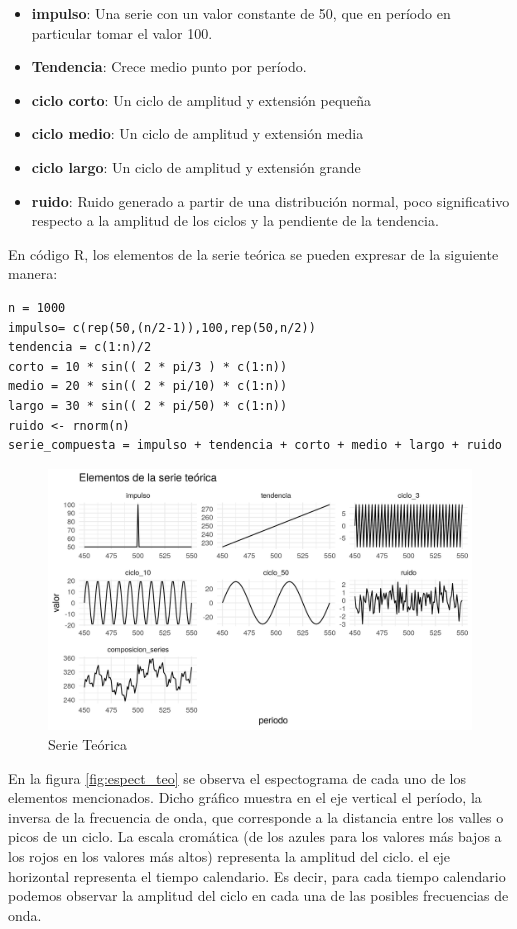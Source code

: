 \documentclass[a4paper]{article}
\begin{document}
\begin{itemize}
	\item \textbf{impulso}: Una serie con un valor constante de 50, que en período en particular tomar el valor 100.
	\item \textbf{Tendencia}: Crece medio punto por período.
	\item \textbf{ciclo corto}: Un ciclo de amplitud y extensión pequeña
	\item \textbf{ciclo medio}: Un ciclo de amplitud y extensión media
	\item \textbf{ciclo largo}: Un ciclo de amplitud y extensión grande
	\item \textbf{ruido}: Ruido generado a partir de una distribución normal, poco significativo respecto a la amplitud de los ciclos y la pendiente de la tendencia.
\end{itemize}

En código R, los elementos de la serie teórica se pueden expresar de la siguiente manera:

\begin{lstlisting}
n = 1000
impulso= c(rep(50,(n/2-1)),100,rep(50,n/2))
tendencia = c(1:n)/2
corto = 10 * sin(( 2 * pi/3 ) * c(1:n))
medio = 20 * sin(( 2 * pi/10) * c(1:n))
largo = 30 * sin(( 2 * pi/50) * c(1:n))
ruido <- rnorm(n)
serie_compuesta = impulso + tendencia + corto + medio + largo + ruido
\end{lstlisting}


\begin{figure}[H]
	\centering
	\includegraphics[width=\linewidth]{serie_teorica.PNG}
	\caption{Serie Teórica} \label{fig:serie_teorica}
\end{figure}

En la figura \ref{fig:espect_teo} se observa el espectograma de cada uno de los elementos mencionados. Dicho gráfico muestra en el eje vertical el período, la inversa de la frecuencia de onda, que corresponde a la distancia entre los valles o picos de un ciclo. La escala cromática (de los azules para los valores más bajos a los rojos en los valores más altos) representa la amplitud del ciclo. el eje horizontal representa el tiempo calendario. Es decir, para cada tiempo calendario podemos observar la amplitud del ciclo en cada una de las posibles frecuencias de onda. 
\end{document}
